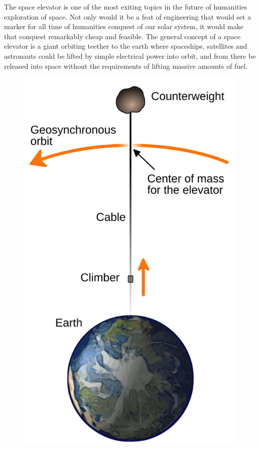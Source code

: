 \documentclass[12pt]{article}
\begin{document}
The space elevator is one of the most exiting topics in the future of humanities exploration of space. Not only would it be a feat of engineering that would set a marker for all time of humanities conquest of our solar system, it would make that conquest remarkably cheap and feasible. The general concept of a space elevator is a giant orbiting teether to the earth where spaceships, satellites and astronauts could be lifted by simple electrical power into orbit, and from there be released into space without the requirements of lifting massive amounts of fuel. 

\begin{figure}[htbp]
  \centering
  \includegraphics{figures/the-space-elavator/structural-diagram}
\end{figure}
\end{document}

